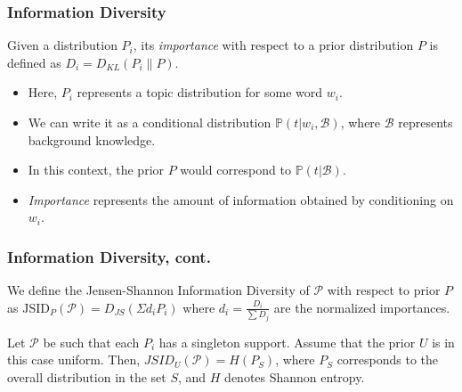 \documentclass{beamer}
\newcommand\bet{\begin{Theorem}}
\newcommand\eet{\end{Theorem}}
\newcommand\bed{\begin{Definition}}
\newcommand\eed{\end{Definition}}
\newcommand\cP{{\mathcal P}}
\newcommand\cB{{\mathcal B}}
\def\pp{{\mathbb P}}
\begin{document}
\begin{frame}
\frametitle{Information Diversity}
\bed\label{importance}
Given a distribution $P_i$, its {\sl importance} with respect to a
prior distribution $P$ is defined as $D_i = D_{KL}(P_i\|P)$.
\eed
\begin{itemize}
\item Here, $P_i$ represents a topic distribution for some word
  $w_i$. 
\item We can write it as a conditional distribution
  $\pp(t|w_i,\cB)$, where $\cB$ represents background knowledge. 
\item In this context, the prior $P$ would correspond to
  $\pp(t|\cB)$. 
\item {\em Importance} represents the amount of information obtained
  by conditioning on $w_i$.
\end{itemize}
\end{frame}

\begin{frame}
\frametitle{Information Diversity, cont.}
\bed\label{diversity}
We define the Jensen-Shannon Information Diversity of $\cP$ with
respect to prior $P$ as $\mbox{JSID}_P(\cP)=D_{JS}(\Sigma d_i P_i)$
where $d_{i}=\frac{D_{i}}{\sum D_{j}}$ are the normalized importances.
\eed
\bet\label{entropy}
Let $\cP$ be such that each $P_i$ has a singleton support. Assume that
the prior $U$ is in this case uniform. Then, 
$JSID_U(\cP)=H(P_S)$,
where $P_S$ corresponds to the overall distribution in the set
$S$, and $H$ denotes Shannon entropy.
\eet
\end{frame}
\end{document}
